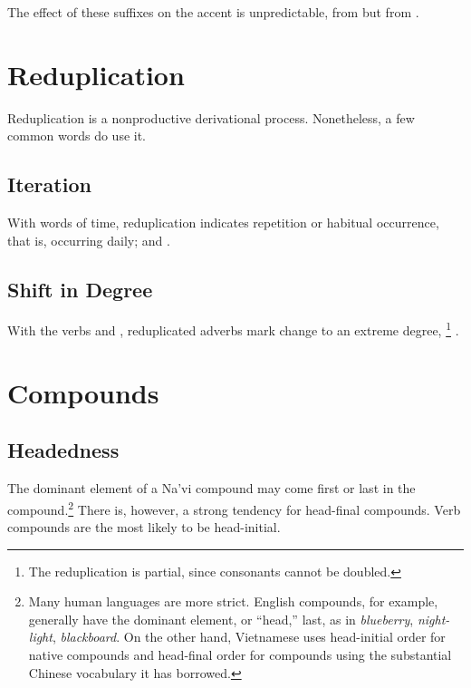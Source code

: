 \subsubsection{} The effect of these suffixes on the accent is
unpredictable,   from 
 but   from
 .


\section{Reduplication}
\noindent Reduplication is a nonproductive derivational process.
Nonetheless, a few common words do use it. 

\subsection{Iteration} With words of time, reduplication indicates
repetition or habitual occurrence,   that is,
occurring daily; and  .

\subsection{Shift in Degree} With the verbs   and
 , reduplicated adverbs mark change to an extreme
degree,  
\footnote{The reduplication is partial, since consonants
cannot be doubled.} .\\

\section{Compounds}

\subsection{Headedness} The dominant element of a Na'vi compound may
come first or last in the compound.\footnote{Many human languages are
more strict.  English compounds, for example, generally have the
dominant element, or ``head,'' last, as in \textit{blueberry},
\textit{night-light}, \textit{blackboard}.  On the other hand,
Vietnamese uses head-initial order for native compounds and
head-final order for compounds using the substantial Chinese
vocabulary it has borrowed.}  There is, however, a strong tendency
for head-final compounds.  Verb compounds are the most likely to be
head-initial.

